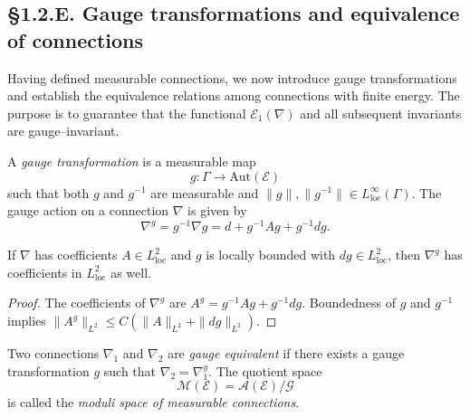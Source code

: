 
\subsection*{§1.2.E. Gauge transformations and equivalence of connections}

Having defined measurable connections, we now introduce gauge transformations and establish the equivalence relations among connections with finite energy.  
The purpose is to guarantee that the functional $\mathcal E_1(\nabla)$ and all subsequent invariants are gauge–invariant.

\begin{definition}
A \emph{gauge transformation} is a measurable map 
\[
g:\Gamma\to \mathrm{Aut}(\mathcal E)
\]
such that both $g$ and $g^{-1}$ are measurable and $\|g\|,\|g^{-1}\|\in L^\infty_{\mathrm{loc}}(\Gamma)$.
The gauge action on a connection $\nabla$ is given by
\[
\nabla^g = g^{-1}\nabla g = d + g^{-1} A g + g^{-1}dg.
\]
\end{definition}

\begin{lemma}\label{lem:1.2.gauge}
If $\nabla$ has coefficients $A\in L^2_{\mathrm{loc}}$ and $g$ is locally bounded with $dg\in L^2_{\mathrm{loc}}$, then $\nabla^g$ has coefficients in $L^2_{\mathrm{loc}}$ as well.
\end{lemma}

\begin{proof}
The coefficients of $\nabla^g$ are $A^g = g^{-1}Ag + g^{-1}dg$. 
Boundedness of $g$ and $g^{-1}$ implies $\|A^g\|_{L^2}\le C(\|A\|_{L^2}+\|dg\|_{L^2})$.
\end{proof}

\begin{definition}
Two connections $\nabla_1$ and $\nabla_2$ are \emph{gauge equivalent} if there exists a gauge transformation $g$ such that $\nabla_2 = \nabla_1^g$.  
The quotient space
\[
\mathcal{M}(\mathcal E) = \mathcal{A}(\mathcal E)/\mathcal{G}
\]
is called the \emph{moduli space of measurable connections}.
\end{definition}


